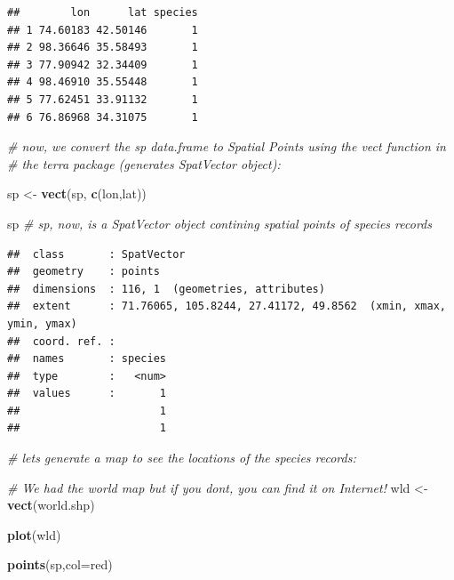 \documentclass[
]{article}
\newenvironment{Shaded}{\begin{snugshade}}{\end{snugshade}}
\newcommand{\AttributeTok}[1]{\textcolor[rgb]{0.13,0.29,0.53}{#1}}
\newcommand{\CommentTok}[1]{\textcolor[rgb]{0.56,0.35,0.01}{\textit{#1}}}
\newcommand{\FunctionTok}[1]{\textcolor[rgb]{0.13,0.29,0.53}{\textbf{#1}}}
\newcommand{\NormalTok}[1]{#1}
\newcommand{\OtherTok}[1]{\textcolor[rgb]{0.56,0.35,0.01}{#1}}
\newcommand{\StringTok}[1]{\textcolor[rgb]{0.31,0.60,0.02}{#1}}
\begin{document}
\begin{verbatim}
##        lon      lat species
## 1 74.60183 42.50146       1
## 2 98.36646 35.58493       1
## 3 77.90942 32.34409       1
## 4 98.46910 35.55448       1
## 5 77.62451 33.91132       1
## 6 76.86968 34.31075       1
\end{verbatim}

\begin{Shaded}
\begin{Highlighting}[]
\CommentTok{\# now, we convert the sp data.frame to Spatial Points using the vect function in}
\CommentTok{\# the terra package (generates SpatVector object):}

\NormalTok{sp }\OtherTok{\textless{}{-}} \FunctionTok{vect}\NormalTok{(sp, }\FunctionTok{c}\NormalTok{(}\StringTok{\textquotesingle{}lon\textquotesingle{}}\NormalTok{,}\StringTok{\textquotesingle{}lat\textquotesingle{}}\NormalTok{))}

\NormalTok{sp }\CommentTok{\# sp, now, is a SpatVector object contining spatial points of species records}
\end{Highlighting}
\end{Shaded}

\begin{verbatim}
##  class       : SpatVector 
##  geometry    : points 
##  dimensions  : 116, 1  (geometries, attributes)
##  extent      : 71.76065, 105.8244, 27.41172, 49.8562  (xmin, xmax, ymin, ymax)
##  coord. ref. :  
##  names       : species
##  type        :   <num>
##  values      :       1
##                      1
##                      1
\end{verbatim}

\begin{Shaded}
\begin{Highlighting}[]
\CommentTok{\# let\textquotesingle{}s generate a map to see the locations of the species records:}

\CommentTok{\# We had the world map but if you don\textquotesingle{}t, you can find it on Internet!}
\NormalTok{wld }\OtherTok{\textless{}{-}} \FunctionTok{vect}\NormalTok{(}\StringTok{\textquotesingle{}world.shp\textquotesingle{}}\NormalTok{) }


\FunctionTok{plot}\NormalTok{(wld)}

\FunctionTok{points}\NormalTok{(sp,}\AttributeTok{col=}\StringTok{\textquotesingle{}red\textquotesingle{}}\NormalTok{)}
\end{Highlighting}
\end{Shaded}
\end{document}
